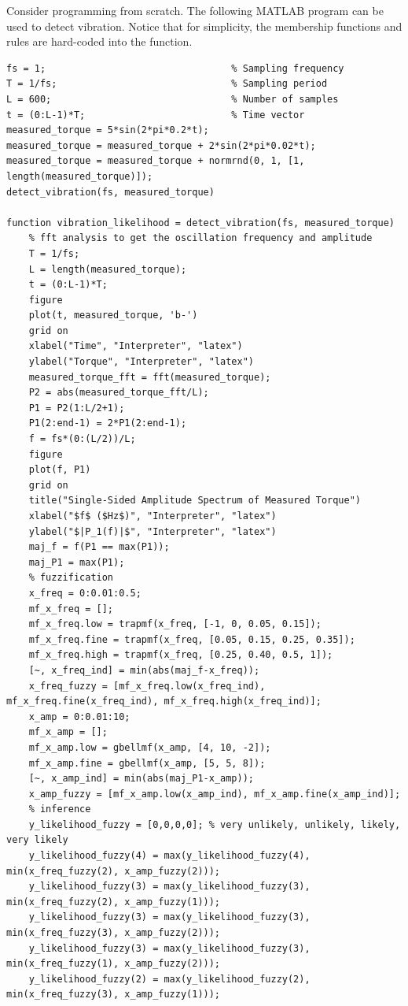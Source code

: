 Consider programming from scratch. The following MATLAB program can be used to detect vibration. Notice that for simplicity, the membership functions and rules are hard-coded into the function.
\begin{lstlisting}
fs = 1;                                 % Sampling frequency                    
T = 1/fs;                               % Sampling period       
L = 600;                                % Number of samples
t = (0:L-1)*T;                          % Time vector
measured_torque = 5*sin(2*pi*0.2*t);
measured_torque = measured_torque + 2*sin(2*pi*0.02*t);
measured_torque = measured_torque + normrnd(0, 1, [1, length(measured_torque)]);
detect_vibration(fs, measured_torque)

function vibration_likelihood = detect_vibration(fs, measured_torque)
	% fft analysis to get the oscillation frequency and amplitude
	T = 1/fs;
	L = length(measured_torque);
	t = (0:L-1)*T;
	figure
	plot(t, measured_torque, 'b-')
	grid on
	xlabel("Time", "Interpreter", "latex")
	ylabel("Torque", "Interpreter", "latex")
	measured_torque_fft = fft(measured_torque);
	P2 = abs(measured_torque_fft/L);
	P1 = P2(1:L/2+1);
	P1(2:end-1) = 2*P1(2:end-1);
	f = fs*(0:(L/2))/L;
	figure
	plot(f, P1)
	grid on
	title("Single-Sided Amplitude Spectrum of Measured Torque")
	xlabel("$f$ ($Hz$)", "Interpreter", "latex")
	ylabel("$|P_1(f)|$", "Interpreter", "latex")
	maj_f = f(P1 == max(P1));
	maj_P1 = max(P1);
	% fuzzification
	x_freq = 0:0.01:0.5;
	mf_x_freq = [];
	mf_x_freq.low = trapmf(x_freq, [-1, 0, 0.05, 0.15]);
	mf_x_freq.fine = trapmf(x_freq, [0.05, 0.15, 0.25, 0.35]);
	mf_x_freq.high = trapmf(x_freq, [0.25, 0.40, 0.5, 1]);
	[~, x_freq_ind] = min(abs(maj_f-x_freq));
	x_freq_fuzzy = [mf_x_freq.low(x_freq_ind), mf_x_freq.fine(x_freq_ind), mf_x_freq.high(x_freq_ind)];
	x_amp = 0:0.01:10;
	mf_x_amp = [];
	mf_x_amp.low = gbellmf(x_amp, [4, 10, -2]);
	mf_x_amp.fine = gbellmf(x_amp, [5, 5, 8]);
	[~, x_amp_ind] = min(abs(maj_P1-x_amp));
	x_amp_fuzzy = [mf_x_amp.low(x_amp_ind), mf_x_amp.fine(x_amp_ind)];
	% inference
	y_likelihood_fuzzy = [0,0,0,0]; % very unlikely, unlikely, likely, very likely
	y_likelihood_fuzzy(4) = max(y_likelihood_fuzzy(4), min(x_freq_fuzzy(2), x_amp_fuzzy(2)));
	y_likelihood_fuzzy(3) = max(y_likelihood_fuzzy(3), min(x_freq_fuzzy(2), x_amp_fuzzy(1)));
	y_likelihood_fuzzy(3) = max(y_likelihood_fuzzy(3), min(x_freq_fuzzy(3), x_amp_fuzzy(2)));
	y_likelihood_fuzzy(3) = max(y_likelihood_fuzzy(3), min(x_freq_fuzzy(1), x_amp_fuzzy(2)));
	y_likelihood_fuzzy(2) = max(y_likelihood_fuzzy(2), min(x_freq_fuzzy(3), x_amp_fuzzy(1)));

\end{lstlisting}
